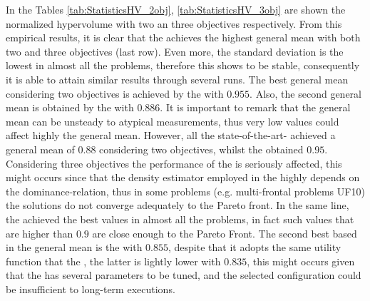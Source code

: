 In the Tables \ref{tab:StatisticsHV_2obj}, \ref{tab:StatisticsHV_3obj} are shown the normalized hypervolume with two an three objectives respectively.
%
From this empirical results, it is clear that the \VSDMOEA{} achieves the highest general mean \HV{} with both two and three objectives (last row).
%
Even more, the standard deviation is the lowest in almost all the problems, therefore this \MOEA{} shows to be stable, consequently it is able to attain similar results through several runs.
%
The best general mean considering two objectives is achieved by the \VSDMOEA{} with $0.955$.
%
Also, the second general mean is obtained by the \NSGAII{} with $0.886$.
%
It is important to remark that the general mean can be unsteady to atypical measurements, thus very low values could affect highly the general mean.
%
However, all the state-of-the-art-\MOEAS{} achieved a general mean of $0.88$ considering two objectives, whilst the \VSDMOEA{} obtained $0.95$.
%
Considering three objectives the performance of the \NSGAII{} is seriously affected, this might occurs since that the density estimator employed in the \NSGAII{} highly depends on the dominance-relation, thus in some problems (e.g. multi-frontal problems UF10) the solutions do not converge adequately to the Pareto front.
%
In the same line, the \VSDMOEA{} achieved the best \HV{} values in almost all the problems, in fact such values that are higher than $0.9$ are close enough to the Pareto Front.
%
The second best \MOEA{} based in the general mean is the \RMOEA{} with $0.855$, despite that it adopts the same utility function that the \MOEAD{}, the latter is lightly lower with $0.835$, this might occurs given that the \MOEAD{} has several parameters to be tuned, and the selected configuration could be insufficient to long-term executions.
%


